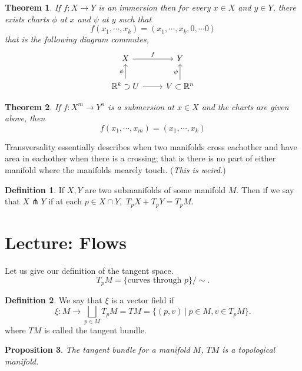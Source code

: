 \documentclass[11pt]{amsart}
\newtheorem{theorem}{Theorem}    %
\newtheorem{proposition}[theorem]{Proposition}
\theoremstyle{definition}
\newtheorem{definition}{Definition}
\begin{document}
\begin{theorem}
	If $f: X \to Y$ is an immersion then  for every $x \in X$ and $y \in Y$, there exists charts $\phi$ at $x$ and $\psi$ at $y$ such that 
	\begin{equation*}
		f(x_1, \cdots, x_k) = (x_1, \cdots, x_k, 0, \cdots 0)
	\end{equation*}
	that is the following diagram commutes,
	\begin{equation*}
		\begin{tikzcd}
			X \arrow{r}{f} & Y\\
			\mathbb{R}^k \supset U \arrow{u}{\phi} \arrow{r} & V \subset \mathbb{R}^n \arrow{u}{\psi}
		\end{tikzcd}
	\end{equation*}
\end{theorem}
\begin{theorem}
	If $f: X^m \to Y^n$ is a submersion at $x \in X$ and the charts are given above, then
	\begin{equation*}
		f(x_1, \cdots, x_m) = (x_1, \cdots, x_k)
	\end{equation*}
\end{theorem}

\noindent Transversality essentially describes when two manifolds cross eachother and have area in eachother when there is a crossing; that is there is no part of either manifold where the manifolds mearely touch. (\emph{This is weird.})

\begin{definition}
	If $X, Y$ are two submanifolds of  some manifold $M$. Then if we say that $X \pitchfork Y$ if at each $p \in X \cap Y,$ $T_pX + T_pY = T_p M.$
\end{definition}

\section{Lecture: Flows}


\noindent Let us give our definition of the tangent space.
\begin{equation*}
	T_p M = \{ \text{curves through }p\} / \sim.
\end{equation*}

\begin{definition}
	We say that $\xi$ is a vector field if 
	\begin{equation*}
		\xi : M \to \bigsqcup_{p \in M} T_{p} M = TM = \{(p, v)\ |\ p \in M, v \in T_p M\}.	
	\end{equation*}
	where $TM$ is called the tangent bundle.
\end{definition}
\begin{proposition}
	The tangent bundle for a manifold $M$, $TM$ is a topological manifold.
\end{proposition}
\end{document}
